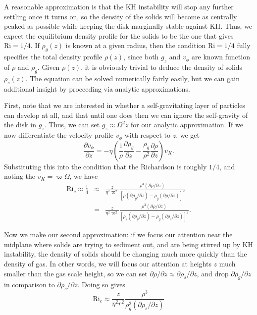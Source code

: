 A reasonable approximation is that the KH instability will stop any further settling once it turns on, so the density of the solids will become as centrally peaked as possible while keeping the disk marginally stable against KH. Thus, we expect the equilibrium density profile for the solids to be the one that gives $\mbox{Ri}=1/4$. If $\rho_g(z)$ is known at a given radius, then the condition $\mbox{Ri} =1/4$ fully specifies the total density profile $\rho(z)$, since both $g_z$ and $v_\phi$ are known function of $\rho$ and $\rho_g$. Given $\rho(z)$, it is obviously trivial to deduce the density of solids $\rho_s(z)$. The equation can be solved numerically fairly easily, but we can gain additional insight by proceeding via analytic approximations.

First, note that we are interested in whether a self-gravitating layer of particles can develop at all, and that until one does then we can ignore the self-gravity of the disk in $g_z$. Thus, we can set $g_z\approx \Omega^2 z$ for our analytic approximation. If we now differentiate the velocity profile $v_{\phi}$ with respect to $z$, we get
\begin{equation}
\frac{\partial v_\phi}{\partial z} = -\eta \left(\frac{1}{\rho} \frac{\partial \rho_g}{\partial z} - \frac{\rho_g}{\rho^2}\frac{\partial \rho}{\partial z}\right) v_K.
\end{equation}
Substituting this into the condition that the Richardson is roughly $1/4$, and noting the $v_K = \varpi\Omega$, we have
\begin{eqnarray}
\mbox{Ri}_c \approx \frac{1}{4} 
& \approx &
\frac{z}{\eta^2 \varpi^2} \frac{\rho^3 (\partial \rho/\partial z)}{\left[\rho (\partial \rho_g/\partial z) - \rho_g (\partial \rho/\partial z)\right]^2} \\
& = &
\frac{z}{\eta^2 \varpi^2} \frac{\rho^3 (\partial \rho/\partial z)}{\left[\rho_s (\partial \rho_g/ \partial z) - \rho_g (\partial \rho_s/\partial z)\right]^2}.
\end{eqnarray}

Now we make our second approximation: if we focus our attention near the midplane where solids are trying to sediment out, and are being stirred up by KH instability, the density of solids should be changing much more quickly than the density of gas. In other words, we will focus our attention at heights $z$ much smaller than the gas scale height, so we can set $\partial \rho/\partial z \approx \partial \rho_s/\partial z$, and drop $\partial \rho_g/\partial z$ in comparison to $\partial \rho_s/\partial z$. Doing so gives
\begin{equation}
\mbox{Ri}_c \approx \frac{z}{\eta^2 r^2} \frac{\rho^3}{\rho_g^2 (\partial\rho_s/\partial z)}
\end{equation}

